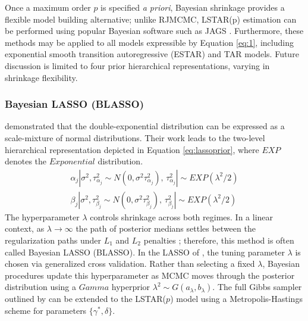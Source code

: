Once a maximum order $p$ is specified \textit{a priori}, Bayesian shrinkage provides a flexible model building alternative; unlike RJMCMC, LSTAR(p) estimation can be performed using popular Bayesian software such as JAGS \citep{Plummer2003}. Furthermore, these methods may be applied to all models expressible by Equation \ref{eq:1}, including exponential smooth transition autoregressive (ESTAR) and TAR models. Future discussion is limited to four prior hierarchical representations, varying in shrinkage flexibility.

\subsubsection{Bayesian LASSO (BLASSO)}
\cite{Andrews1974} demonstrated that the double-exponential distribution can be expressed as a scale-mixture of normal distributions. Their work leads to the two-level hierarchical representation depicted in Equation \ref{eq:lassoprior}, where $EXP$ denotes the $Exponential$ distribution.
\begin{equation}
	\label{eq:lassoprior}
	\begin{split}
	\alpha_j|\sigma^2,\tau^2_{\alpha_j} \sim N(0,\sigma^2\tau^2_{\alpha_j}) \textrm{,  }  \tau^2_{\alpha_j}| \sim EXP(\lambda^2/2)\\ 
	 \beta_j|\sigma^2,\tau^2_{\beta_j}\sim N(0,\sigma^2\tau^2_{\beta_j}) \textrm{,  } \tau^2_{\beta_j}| \sim EXP(\lambda^2/2)
	\end{split}
\end{equation}
The hyperparameter $\lambda$ controls shrinkage across both regimes. In a linear context, as $\lambda \to \infty$ the path of  posterior medians settles between the regularization paths under $L_1$ and $L_2$ penalties \citep{Park2008}; therefore, this method is often called Bayesian LASSO (BLASSO). In the LASSO of \cite{Tibshirani1996}, the tuning parameter $\lambda$ is chosen via generalized cross validation. Rather than selecting a fixed $\lambda$, Bayesian procedures update this hyperparameter as MCMC moves through the posterior distribution
\citep{George2000,Casella2001,Yuan2005} using a $Gamma$ hyperprior $\lambda^2 \sim G(a_\lambda,b_\lambda)$. The full Gibbs sampler outlined by \cite{Park2008} can be extended to the LSTAR($p$) model using a  Metropolis-Hastings scheme for parameters $\{\gamma^*, \delta\}$.

